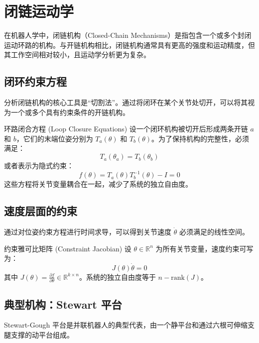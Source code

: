 \chapter{闭链运动学}

在机器人学中，闭链机构（Closed-Chain Mechanisms）是指包含一个或多个封闭运动环路的机构。与开链机构相比，闭链机构通常具有更高的强度和运动精度，但其工作空间相对较小，且运动学分析更为复杂。

\section{闭环约束方程}
分析闭链机构的核心工具是“切割法”。通过将闭环在某个关节处切开，可以将其视为一个或多个具有约束条件的开链机构。

\begin{defbox}{环路闭合方程 (Loop Closure Equations)}
设一个闭环机构被切开后形成两条开链 $a$ 和 $b$，它们的末端位姿分别为 $T_a(\theta)$ 和 $T_b(\theta)$。为了保持机构的完整性，必须满足：
\begin{equation}
    T_a(\theta_a) = T_b(\theta_b)
\end{equation}
或者表示为隐式约束：
\begin{equation}
    f(\theta) = T_a(\theta) T_b^{-1}(\theta) - I = 0
\end{equation}
这些方程将关节变量耦合在一起，减少了系统的独立自由度。
\end{defbox}



\section{速度层面的约束}
通过对位姿约束方程进行时间求导，可以得到关节速度 $\dot{\theta}$ 必须满足的线性空间。

\begin{mybox}{约束雅可比矩阵 (Constraint Jacobian)}
设 $\theta \in \mathbb{R}^n$ 为所有关节变量，速度约束可写为：
\begin{equation}
    J(\theta) \dot{\theta} = 0
\end{equation}
其中 $J(\theta) = \frac{\partial f}{\partial \theta} \in \mathbb{R}^{k \times n}$。系统的独立自由度等于 $n - \text{rank}(J)$。
\end{mybox}

\section{典型机构：Stewart 平台}
Stewart-Gough 平台是并联机器人的典型代表，由一个静平台和通过六根可伸缩支腿支撑的动平台组成。



